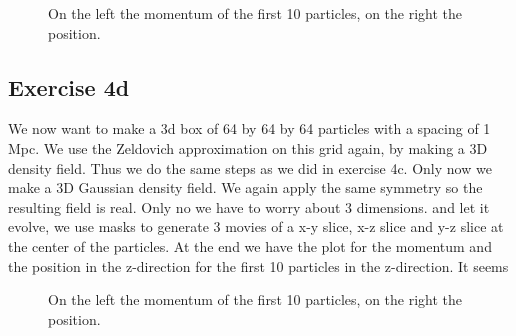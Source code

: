 \begin{figure}
    \centering
    \qquad
    \caption{On the left the momentum of the first 10 particles, on the right the position.}
    \label{fig:z}
\end{figure}


\subsection{Exercise 4d}
We now want to make a 3d box of 64 by 64 by 64 particles with a spacing of 1 Mpc. We use the Zeldovich approximation on this grid again, by making a 3D density field. Thus we do the same steps as we did in exercise 4c. Only now we make a 3D Gaussian density field. We again apply the same symmetry so the resulting field is real. Only no we have to worry about 3 dimensions.
and let it evolve, we use masks to generate 3 movies of a x-y slice, x-z slice and y-z slice at the center of the particles. At the end we have the plot for the momentum and the position in the z-direction for the first 10 particles in the z-direction. It seems 

\begin{figure}
    \centering
    \qquad
    \caption{On the left the momentum of the first 10 particles, on the right the position.}
    \label{fig:z}
\end{figure}


